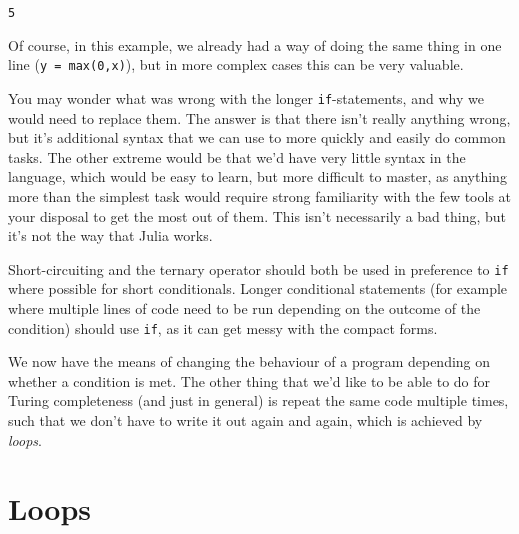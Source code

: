 \documentclass[
  letterpaper,
  DIV=11,
  numbers=noendperiod]{scrreprt}
\begin{document}
\begin{verbatim}
5
\end{verbatim}

Of course, in this example, we already had a way of doing the same thing
in one line (\texttt{y\ =\ max(0,x)}), but in more complex cases this
can be very valuable.

You may wonder what was wrong with the longer \texttt{if}-statements,
and why we would need to replace them. The answer is that there isn't
really anything wrong, but it's additional syntax that we can use to
more quickly and easily do common tasks. The other extreme would be that
we'd have very little syntax in the language, which would be easy to
learn, but more difficult to master, as anything more than the simplest
task would require strong familiarity with the few tools at your
disposal to get the most out of them. This isn't necessarily a bad
thing, but it's not the way that Julia works.

\begin{tcolorbox}[enhanced jigsaw, toprule=.15mm, opacitybacktitle=0.6, leftrule=.75mm, breakable, coltitle=black, bottomrule=.15mm, colbacktitle=quarto-callout-tip-color!10!white, bottomtitle=1mm, rightrule=.15mm, title=\textcolor{quarto-callout-tip-color}{\faLightbulb}\hspace{0.5em}{Convention}, colframe=quarto-callout-tip-color-frame, left=2mm, colback=white, opacityback=0, arc=.35mm, toptitle=1mm, titlerule=0mm]

Short-circuiting and the ternary operator should both be used in
preference to \texttt{if} where possible for short conditionals. Longer
conditional statements (for example where multiple lines of code need to
be run depending on the outcome of the condition) should use
\texttt{if}, as it can get messy with the compact forms.

\end{tcolorbox}

We now have the means of changing the behaviour of a program depending
on whether a condition is met. The other thing that we'd like to be able
to do for Turing completeness (and just in general) is repeat the same
code multiple times, such that we don't have to write it out again and
again, which is achieved by \emph{loops}.

\hypertarget{loops}{%
\section{Loops}\label{loops}}
\end{document}
